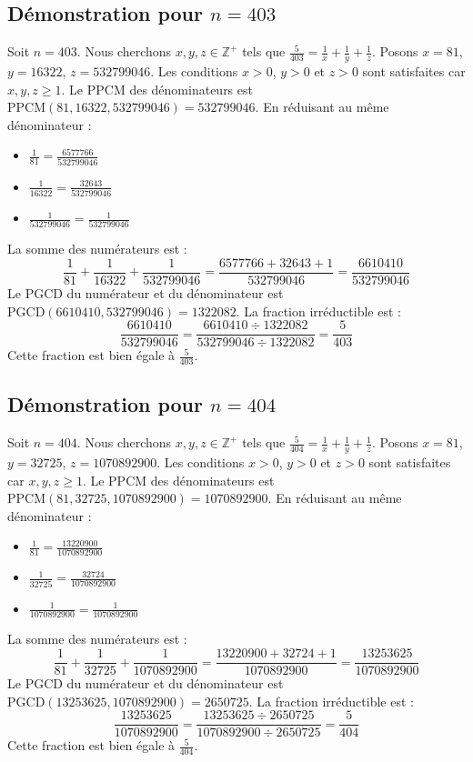 \documentclass[11pt,a4paper]{article}
\begin{document}
\subsection{Démonstration pour $n = 403$}
Soit $n = 403$. Nous cherchons $x, y, z \in \mathbb{Z}^{+}$ tels que $\frac{5}{403} = \frac{1}{x} + \frac{1}{y} + \frac{1}{z}$.
Posons $x = 81$, $y = 16322$, $z = 532799046$.
Les conditions $x > 0$, $y > 0$ et $z > 0$ sont satisfaites car $x, y, z \geq 1$.
Le PPCM des dénominateurs est $\text{PPCM}(81, 16322, 532799046) = 532799046$.
En réduisant au même dénominateur :
\begin{itemize}
    \item $\frac{1}{81} = \frac{6577766}{532799046}$
    \item $\frac{1}{16322} = \frac{32643}{532799046}$
    \item $\frac{1}{532799046} = \frac{1}{532799046}$
\end{itemize}
La somme des numérateurs est :
$$ \frac{1}{81} + \frac{1}{16322} + \frac{1}{532799046} = \frac{6577766 + 32643 + 1}{532799046} = \frac{6610410}{532799046} $$
Le PGCD du numérateur et du dénominateur est $\text{PGCD}(6610410, 532799046) = 1322082$.
La fraction irréductible est :
$$ \frac{6610410}{532799046} = \frac{6610410 \div 1322082}{532799046 \div 1322082} = \frac{5}{403} $$
Cette fraction est bien égale à $\frac{5}{403}$.

\subsection{Démonstration pour $n = 404$}
Soit $n = 404$. Nous cherchons $x, y, z \in \mathbb{Z}^{+}$ tels que $\frac{5}{404} = \frac{1}{x} + \frac{1}{y} + \frac{1}{z}$.
Posons $x = 81$, $y = 32725$, $z = 1070892900$.
Les conditions $x > 0$, $y > 0$ et $z > 0$ sont satisfaites car $x, y, z \geq 1$.
Le PPCM des dénominateurs est $\text{PPCM}(81, 32725, 1070892900) = 1070892900$.
En réduisant au même dénominateur :
\begin{itemize}
    \item $\frac{1}{81} = \frac{13220900}{1070892900}$
    \item $\frac{1}{32725} = \frac{32724}{1070892900}$
    \item $\frac{1}{1070892900} = \frac{1}{1070892900}$
\end{itemize}
La somme des numérateurs est :
$$ \frac{1}{81} + \frac{1}{32725} + \frac{1}{1070892900} = \frac{13220900 + 32724 + 1}{1070892900} = \frac{13253625}{1070892900} $$
Le PGCD du numérateur et du dénominateur est $\text{PGCD}(13253625, 1070892900) = 2650725$.
La fraction irréductible est :
$$ \frac{13253625}{1070892900} = \frac{13253625 \div 2650725}{1070892900 \div 2650725} = \frac{5}{404} $$
Cette fraction est bien égale à $\frac{5}{404}$.
\end{document}
